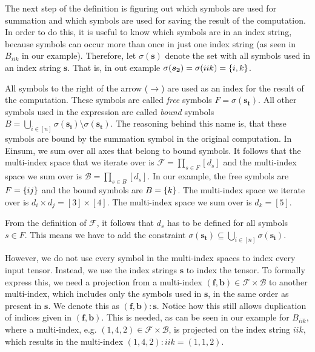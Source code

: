 \begin{definition}
    The next step of the definition is figuring out which symbols are used for summation and which symbols are used for saving the result of the computation.
    In order to do this, it is useful to know which symbols are in an index string, because symbols can occur more than once in just one index string (as seen in $B_{iik}$ in our example).
    Therefore, let $\sigma(\bm{s})$ denote the set with all symbols used in an index string $\bm{s}$.
    That is, in out example $\sigma(\bm{s_2}) = \sigma(iik) = \lbrace i, k \rbrace$.

    All symbols to the right of the arrow ($\rightarrow$) are used as an index for the result of the computation.
    These symbols are called \textit{free} symbols $F = \sigma(\bm{s_t})$.
    All other symbols used in the expression are called \textit{bound} symbols $B = \bigcup_{i \in [n]} \sigma(\bm{s_i}) \setminus \sigma(\bm{s_t})$.
    The reasoning behind this name is, that these symbols are bound by the summation symbol in the original computation.
    In Einsum, we sum over all axes that belong to bound symbols.
    It follows that the multi-index space that we iterate over is $\mathcal{F} = \prod_{s \in F} [d_s]$ and the multi-index space we sum over is $\mathcal{B} = \prod_{s \in B} [d_s]$.
    In our example, the free symbols are $F = \lbrace ij \rbrace$ and the bound symbols are $B = \lbrace k \rbrace$.
    The multi-index space we iterate over is $d_i \times d_j = [3] \times [4]$.
    The multi-index space we sum over is $d_k = [5]$.

    From the definition of $\mathcal{F}$, it follows that $d_s$ has to be defined for all symbols $s \in F$.
    This means we have to add the constraint $\sigma(\bm{s_t}) \subseteq \bigcup_{i \in [n]} \sigma(\bm{s_i})$.

    However, we do not use every symbol in the multi-index spaces to index every input tensor.
    Instead, we use the index strings $\bm{s}$ to index the tensor.
    To formally express this, we need a projection from a multi-index $(\bm{f},\bm{b}) \in \mathcal{F} \times \mathcal{B}$ to another multi-index, which includes only the symbols used in $\bm{s}$,
    in the same order as present in $\bm{s}$.
    We denote this as $(\bm{f},\bm{b}):\bm{s}$.
    Notice how this still allows duplication of indices given in $(\bm{f},\bm{b})$.
    This is needed, as can be seen in our example for $B_{iik}$,
    where a multi-index, e.g. $(1,4,2) \in \mathcal{F} \times \mathcal{B}$, is projected on the index string $iik$,
    which results in the multi-index $(1,4,2):iik = (1,1,2)$.


\end{definition}
